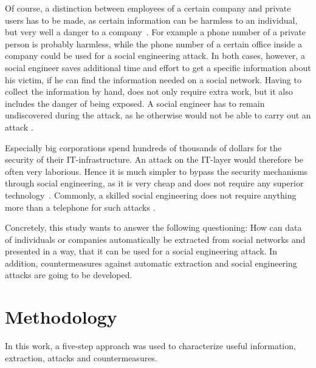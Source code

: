 Of course, a distinction between employees of a certain company and private
users has to be made, as certain information can be harmless to an
individual, but very well a danger to a company~\cite{mitnick2003}. For example
a phone number of a private person is probably harmless, while the phone number
of a certain office inside a company could be used for a social engineering
attack. In both cases, however, a social engineer saves additional time and
effort to get a specific information about his victim, if he can find the
information needed on a social network. Having to collect the
information by hand, does not only require extra work, but it also includes the
danger of being exposed. A social engineer has to remain undiscovered during
the attack, as he otherwise would not be able to carry out an attack
\cite{mitnick2003}.

Especially big corporations spend hundreds of thousands of dollars for the
security of their IT-infrastructure. An attack on the IT-layer would therefore
be often very laborious. Hence it is much simpler to bypass the security
mechanisms through social engineering, as it is very cheap and does not require
any superior technology~\cite{winkler1995}. Commonly, a skilled social
engineering does not require anything more than a telephone for such attacks
\cite{mitnick2003}.

Concretely, this study wants to answer the following questioning:
How can data of individuals or companies automatically be extracted
from social networks and presented in a way, that it can be used for a social
engineering attack. In addition, countermeasures against automatic extraction
and social engineering attacks are going to be developed.

\section{Methodology}

In this work, a five-step approach was used to characterize useful information,
extraction, attacks and countermeasures.

